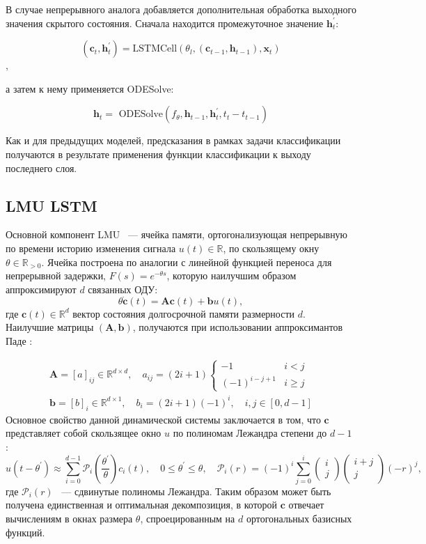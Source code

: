 \documentclass{article}
\newcommand{\x}{\mathbf{x}}
\newcommand{\cc}{\mathbf{c}}
\newcommand{\h}{\mathbf{h}}
\begin{document}
В случае непрерывного аналога добавляется дополнительная обработка выходного значения скрытого состояния. Сначала находится промежуточное значение $\h_t^{\prime}$:

$$(\cc_t, \h_t^{\prime}) = \text{LSTMCell}\left(\theta_{l},\left(\cc_{t-1}, \mathbf{h}_{t-1}\right), \x_{t}\right)$$,

а затем к нему применяется ODESolve:

$$\mathbf{h}_{t}=\text { ODESolve}\left(f_{\theta}, \mathbf{h}_{t-1}, \mathbf{h}_{t}^{\prime}, t_{t}-t_{t-1}\right)$$

Как и для предыдущих моделей, предсказания в рамках задачи классификации получаются в результате применения функции классификации к выходу последнего слоя.

\subsection{LMU LSTM}

Основной компонент LMU ~--- ячейка памяти, ортогонализующая непрерывную по времени историю изменения сигнала  $u(t) \in \mathbb{R}$, по скользящему окну $\theta \in \mathbb{R}_{>0}$. Ячейка построена по аналогии с линейной функцией переноса для непрерывной задержки, $F(s)=e^{-\theta s}$, которую наилучшим образом аппроксимируют $d$ связанных ОДУ:
$$
\theta \dot{\mathbf{c}}(t)=\mathbf{A} \mathbf{c}(t)+\mathbf{b} u(t),
$$
где $\mathbf{c}(t) \in \mathbb{R}^{d}$ вектор состояния долгосрочной памяти размерности $d$. Наилучшие матрицы $(\mathbf{A}, \mathbf{b})$, получаются при использовании аппроксимантов Паде \cite{voelkerthesis}:

$$
\begin{array}{c}
\mathbf{A}=[a]_{i j} \in \mathbb{R}^{d \times d}, \quad a_{i j}=(2 i+1)\left\{\begin{array}{ll}
-1 & i<j \\
(-1)^{i-j+1} & i \geq j
\end{array}\right. \\
\mathbf{b}=[b]_{i} \in \mathbb{R}^{d \times 1}, \quad b_{i}=(2 i+1)(-1)^{i}, \quad i, j \in[0, d-1]
\end{array}
$$
Основное свойство данной динамической системы заключается в том, что $\mathbf{c}$ представляет собой скользящее окно $u$ по полиномам Лежандра степени до $d-1$ :
$$
u\left(t-\theta^{\prime}\right) \approx \sum_{i=0}^{d-1} \mathcal{P}_{i}\left(\frac{\theta^{\prime}}{\theta}\right) c_{i}(t), \quad 0 \leq \theta^{\prime} \leq \theta, \quad \mathcal{P}_{i}(r)=(-1)^{i} \sum_{j=0}^{i}\left(\begin{array}{c}
i \\
j
\end{array}\right)\left(\begin{array}{c}
i+j \\
j
\end{array}\right)(-r)^{j},
$$
где  $\mathcal{P}_{i}(r)$  ~--- сдвинутые полиномы Лежандра. Таким образом может быть получена единственная и оптимальная декомпозиция, в которой $\mathbf{c}$ отвечает вычислениям в окнах размера $\theta$, спроецированным на $d$ ортогональных базисных функций.
\end{document}
